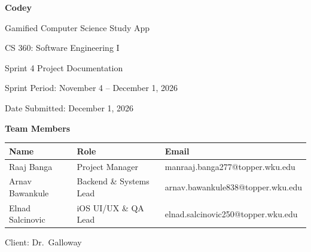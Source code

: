 \documentclass[12pt,letterpaper]{article}
\begin{document}
\begin{titlepage}
\begin{singlespace}
\centering
\vspace*{1.2in}
{\LARGE\bfseries Codey\par}
\vspace{0.25cm}
{\Large Gamified Computer Science Study App\par}
\vspace{1.2cm}
{\large CS 360: Software Engineering I\par}
\vspace{0.3cm}
{\large Sprint 4 Project Documentation\par}
\vspace{0.3cm}
{\large Sprint Period: November 4 -- December 1, 2026\par}
\vspace{0.3cm}
{\large Date Submitted: December 1, 2026\par}
\vspace{1.6cm}
{\large\bfseries Team Members\par}
\vspace{0.4cm}
\begin{tabular}{lll}
\toprule
\textbf{Name} & \textbf{Role} & \textbf{Email} \\
\midrule
Raaj Banga        & Project Manager            & manraaj.banga277@topper.wku.edu \\
Arnav Bawankule   & Backend \& Systems Lead    & arnav.bawankule838@topper.wku.edu \\
Elnad Salcinovic  & iOS UI/UX \& QA Lead       & elnad.salcinovic250@topper.wku.edu \\
\bottomrule
\end{tabular}
\vfill
{\large Client: Dr.\ Galloway\par}
\vspace{0.5in}
\end{singlespace}
\end{titlepage}

\setcounter{page}{2}
\begin{singlespace}
\tableofcontents
\clearpage
\listoffigures
\listoftables
\end{singlespace}
\clearpage
\end{document}
